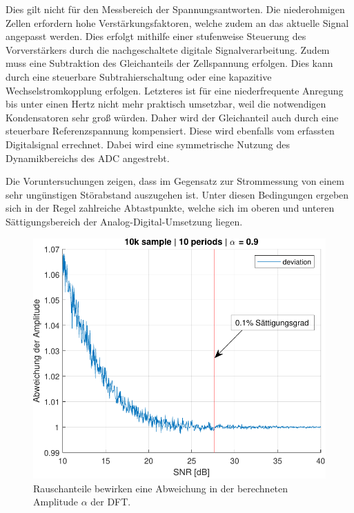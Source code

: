 \smallskip
Dies gilt nicht für den Messbereich der Spannungsantworten. Die niederohmigen Zellen erfordern hohe Verstärkungsfaktoren, welche zudem an das aktuelle Signal angepasst werden. Dies erfolgt mithilfe einer stufenweise Steuerung des Vorverstärkers durch die nachgeschaltete digitale Signalverarbeitung.
Zudem muss eine Subtraktion des Gleichanteils der Zellspannung erfolgen. Dies kann durch eine steuerbare Subtrahierschaltung oder eine kapazitive Wechselstromkopplung erfolgen. Letzteres ist für eine niederfrequente Anregung bis unter einen Hertz nicht mehr praktisch umsetzbar, weil die notwendigen Kondensatoren sehr groß würden. Daher wird der Gleichanteil auch durch eine steuerbare Referenzspannung kompensiert. Diese wird ebenfalls vom erfassten Digitalsignal errechnet.
Dabei wird eine symmetrische Nutzung des Dynamikbereichs des ADC angestrebt.

\smallskip
Die Voruntersuchungen zeigen, dass im Gegensatz zur Strommessung von einem sehr ungünstigen Störabstand auszugehen ist. Unter diesen Bedingungen ergeben sich in der Regel zahlreiche Abtastpunkte, welche sich im oberen und unteren Sättigungsbereich der Analog-Digital-Umsetzung liegen.

\begin{figure}[t!] 
	\centering
	\includegraphics[width=1\columnwidth]{../img/noise-err.pdf}
	\caption{Rauschanteile bewirken eine Abweichung in der berechneten Amplitude $\alpha$ der DFT.}
	\label{fig:Rauschanteil}
\end{figure}

